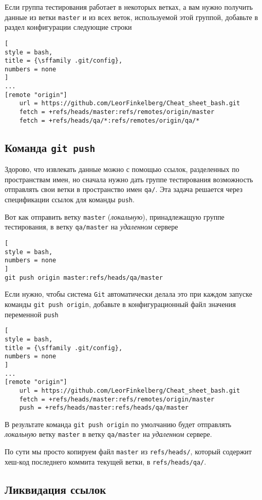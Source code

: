 \documentclass[%
	11pt,
	a4paper,
	utf8,
		]{article}
\begin{document}
Если группа тестирования работает в некоторых ветках, а вам нужно получить данные из ветки \texttt{master} и из всех веток, используемой этой группой, добавьте в раздел конфигурации следующие строки
\begin{lstlisting}[
style = bash,
title = {\sffamily .git/config},
numbers = none
]
...
[remote "origin"]
    url = https://github.com/LeorFinkelberg/Cheat_sheet_bash.git
    fetch = +refs/heads/master:refs/remotes/origin/master
    fetch = +refs/heads/qa/*:refs/remotes/origin/qa/*
\end{lstlisting}


\subsection{Команда \texttt{git push}}

Здорово, что извлекать данные можно с помощью ссылок, разделенных по пространствам имен, но сначала нужно дать группе тестирования возможность отправлять свои ветки в пространство имен \verb|qa/|. Эта задача решается через спецификации ссылок для команды \texttt{push}.

Вот как отправить ветку \texttt{master} (\emph{локальную}), принадлежащую группе тестирования, в ветку \verb|qa/master| на \emph{удаленном} сервере
\begin{lstlisting}[
style = bash,
numbers = none
]
git push origin master:refs/heads/qa/master
\end{lstlisting}

Если нужно, чтобы система \texttt{Git} автоматически делала это при каждом запуске команды \texttt{git push origin}, добавьте в конфигурационный файл значения переменной \texttt{push}
\begin{lstlisting}[
style = bash,
title = {\sffamily .git/config},
numbers = none
]
...
[remote "origin"]
    url = https://github.com/LeorFinkelberg/Cheat_sheet_bash.git
    fetch = +refs/heads/master:refs/remotes/origin/master
    push = +refs/heads/master:refs/heads/qa/master
\end{lstlisting}

В результате команда \texttt{git push origin} по умолчанию будет отправлять \emph{локальную} ветку \texttt{master} в ветку \verb|qa/master| на \emph{удаленном} сервере.

По сути мы просто копируем файл \texttt{master} из \verb|refs/heads/|, который содержит хеш-код последнего коммита текущей ветки, в \verb|refs/heads/qa/|.

\subsection{Ликвидация ссылок}
\end{document}
